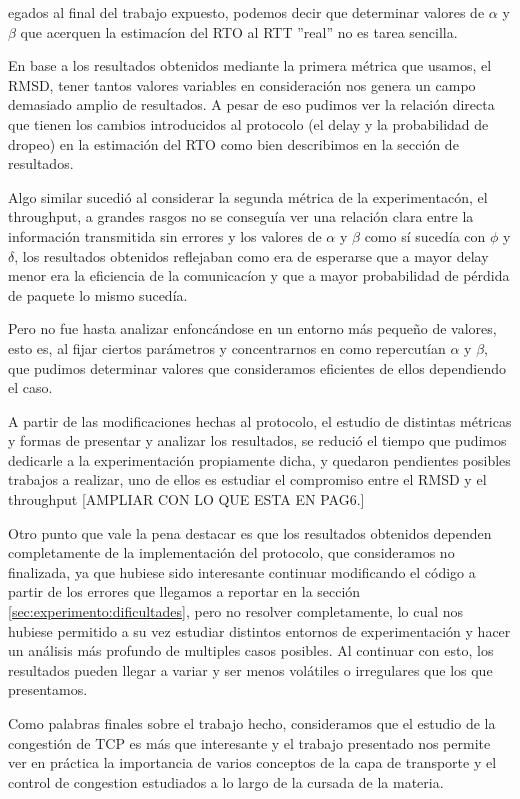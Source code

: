 egados al final del trabajo expuesto, podemos decir que determinar valores 
de $\alpha$ y $\beta$ que acerquen la estimac\'ion del RTO al RTT ''real'' no es tarea sencilla.

En base a los resultados obtenidos mediante la primera m\'etrica que usamos, el RMSD, tener 
tantos valores variables en consideraci\'on nos genera un campo demasiado amplio de resultados.
A pesar de eso pudimos ver la relaci\'on directa que tienen los cambios introducidos al
protocolo (el delay y la probabilidad de dropeo) en la estimaci\'on del RTO como bien describimos
en la secci\'on de resultados.

Algo similar sucedi\'o al considerar la segunda m\'etrica de la experimentac\'on, el throughput,
a grandes rasgos no se consegu\'ia ver una relaci\'on clara entre la informaci\'on transmitida sin
errores y los valores de $\alpha$ y $\beta$ como s\'i suced\'ia con $\phi$ y $\delta$, los resultados 
obtenidos reflejaban como era de esperarse que a mayor delay menor era la eficiencia de la comunicac\'ion 
y que a mayor probabilidad de p\'erdida de paquete lo mismo suced\'ia.


Pero no fue hasta analizar enfonc\'andose en un entorno m\'as peque\~no de valores, esto es,
al fijar ciertos par\'ametros y concentrarnos en como repercut\'ian $\alpha$ y $\beta$, que pudimos 
determinar valores que consideramos eficientes de ellos dependiendo el caso.

A partir de las modificaciones hechas al protocolo, el estudio de distintas m\'etricas y formas de
presentar y analizar los resultados, se reduci\'o el tiempo que pudimos dedicarle a la experimentaci\'on
propiamente dicha, y quedaron pendientes posibles trabajos a realizar, uno de ellos es estudiar el
compromiso entre el RMSD y el throughput [AMPLIAR CON LO QUE ESTA EN PAG6.]

Otro punto que vale la pena destacar es que los resultados obtenidos dependen completamente de la 
implementaci\'on del protocolo, que consideramos no finalizada, ya que hubiese sido interesante
continuar modificando el c\'odigo a partir de los errores que llegamos a reportar en la secci\'on 
\ref{sec:experimento:dificultades}, pero no resolver completamente, lo cual nos hubiese permitido 
a su vez estudiar distintos entornos de experimentaci\'on y hacer un an\'alisis m\'as profundo de 
multiples casos posibles. Al continuar con esto, los resultados pueden llegar a variar y ser menos vol\'atiles o irregulares que los que presentamos.

Como palabras finales sobre el trabajo hecho, consideramos que el estudio de la congesti\'on de TCP
es m\'as que interesante y el trabajo presentado nos permite ver en pr\'actica la importancia de varios 
conceptos de la capa de transporte y el control de congestion estudiados a lo largo de la cursada
de la materia.